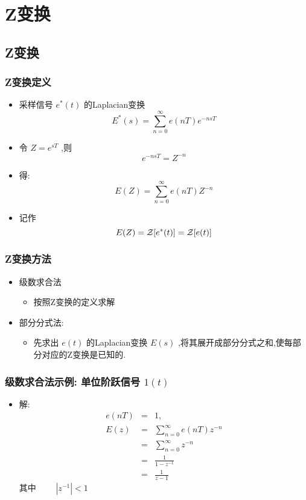 \documentclass[table]{article}
\begin{document}
\section{Z变换}
\label{sec-3}
\subsection{Z变换}
\label{sec-3-1}
\begin{frame}
\frametitle{Z变换定义}
\label{sec-3-1-1}

\begin{itemize}
\item 采样信号  $e^*(t)$  的Laplacian变换  
       \[E^*(s)=\sum_{n=0}^{\infty}e(nT)e^{-nsT}\]
\item <2->令  $Z=e^{sT}$ ,则  
       \[e^{-nsT}=Z^{-n}\]
\item <3->得:  
       \[E(Z)=\sum_{n=0}^{\infty}e(nT)Z^{-n}\]
\item <3->记作  
       \[E(Z)={\cal Z}[e^*(t)]={\cal Z}[e(t)]\]
\end{itemize}
\end{frame}
\begin{frame}
\frametitle{Z变换方法}
\label{sec-3-1-2}

\begin{itemize}
\item 级数求合法
\begin{itemize}
\item 按照Z变换的定义求解
\end{itemize}
\item 部分分式法:
\begin{itemize}
\item 先求出  $e(t)$  的Laplacian变换  $E(s)$  ,将其展开成部分分式之和,使每部分对应的Z变换是已知的.
\end{itemize}
\end{itemize}
\end{frame}
\begin{frame}
\frametitle{级数求合法示例: 单位阶跃信号 $1(t)$}
\label{sec-3-1-3}

\begin{itemize}
\item <2-> 解: 
       \begin{eqnarray*}
       e(nT)&=&1 , \\
       E(z) &=  &\sum_{n=0}^{\infty}e(nT)z^{-n} \\
       	&=& \sum_{n=0}^{\infty}z^{-n} \\
       &=& \frac{1}{1-z^{-1}} \\
       &=& \frac{1}{z-1}
       \end{eqnarray*}
       其中  $\qquad |z^{-1}|<1$
\end{itemize}
\end{frame}
\end{document}
